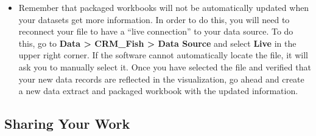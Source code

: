 \documentclass[
]{book}
\begin{document}
\begin{enumerate}
\begin{itemize}
  \item
    Remember that packaged workbooks will not be automatically updated when your datasets get more information. In order to do this, you will need to reconnect your file to have a ``live connection'' to your data source. To do this, go to \textbf{Data \textgreater{} CRM\_Fish \textgreater{} Data Source} and select \textbf{Live} in the upper right corner. If the software cannot automatically locate the file, it will ask you to manually select it. Once you have selected the file and verified that your new data records are reflected in the visualization, go ahead and create a new data extract and packaged workbook with the updated information.
  \end{itemize}
\end{enumerate}

\hypertarget{sharing-your-work}{%
\subsection{Sharing Your Work}\label{sharing-your-work}}
\end{document}
